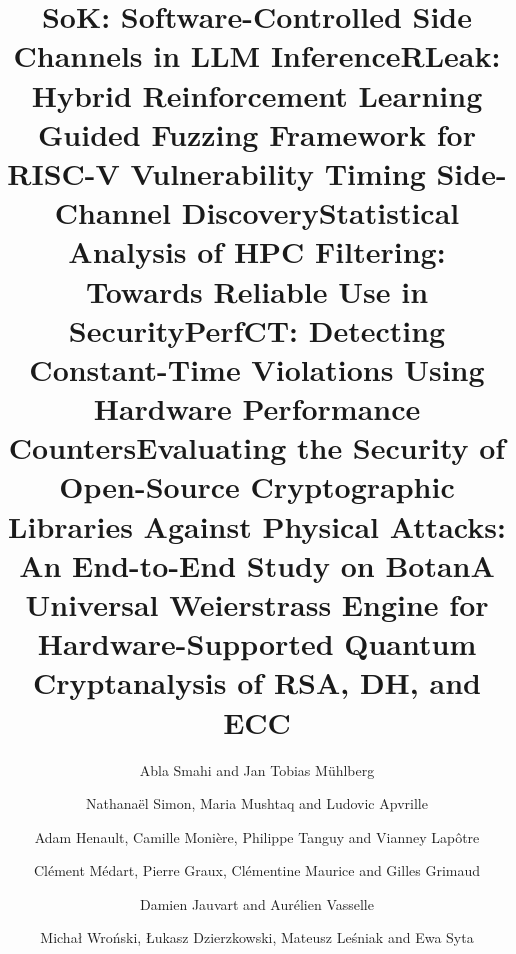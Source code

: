\documentclass[runningheads]{llncs}
\begin{document}
\setcounter{page}{2}
\author{Abla Smahi and Jan Tobias M\"uhlberg}
\title{SoK: Software-Controlled Side Channels in LLM Inference}
\maketitle
\clearpage

\setcounter{page}{3}
\author{Nathana\"el Simon, Maria Mushtaq and Ludovic Apvrille}
\title{RLeak: Hybrid Reinforcement Learning Guided Fuzzing Framework for RISC-V Vulnerability Timing Side-Channel Discovery}
\maketitle
\clearpage

\setcounter{page}{4}
\author{Adam Henault, Camille Moni\`ere, Philippe Tanguy and Vianney Lap\^otre}
\title{Statistical Analysis of HPC Filtering: Towards Reliable Use in Security}
\maketitle
\clearpage

\setcounter{page}{5}
\author{Cl\'ement M\'edart, Pierre Graux, Cl\'ementine Maurice and Gilles Grimaud}
\title{PerfCT: Detecting Constant-Time Violations Using Hardware Performance Counters}
\maketitle
\clearpage

\setcounter{page}{6}
\author{Damien Jauvart and Aur\'elien Vasselle}
\title{Evaluating the Security of Open-Source Cryptographic Libraries Against Physical Attacks: An End-to-End Study on Botan}
\maketitle
\clearpage

\setcounter{page}{7}
\author{Micha{\l} Wro\'nski, {\L}ukasz Dzierzkowski, Mateusz Le\'sniak and Ewa Syta}
\title{A Universal Weierstrass Engine for Hardware-Supported Quantum Cryptanalysis of RSA, DH, and ECC}
\maketitle
\clearpage
\end{document}
